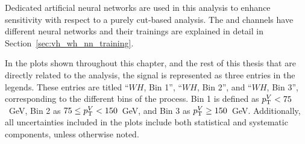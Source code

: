 Dedicated artificial neural networks are used in this analysis to enhance sensitivity with respect to a purely cut-based analysis. The \zdom{} and \zdep{} channels have different neural networks and their trainings are explained in detail in Section~\ref{sec:vh_wh_nn_training}. 

In the plots shown throughout this chapter, and the rest of this thesis that are directly related to the \wh{} analysis, the signal is represented as three entries in the legends. These entries are titled ``$WH$, Bin 1'', ``$WH$, Bin 2'', and ``$WH$, Bin 3'', corresponding to the different \ptv{} bins of the \wh{} process. Bin 1 is defined as $p_{\mathrm{T}}^{V}{} < 75$~GeV, Bin 2 as $75 \leq p_{\mathrm{T}}^{V}{} < 150$~GeV, and Bin 3 as $p_{\mathrm{T}}^{V}{} \geq 150$~GeV. Additionally, all uncertainties included in the plots include both statistical and systematic components, unless otherwise noted.

